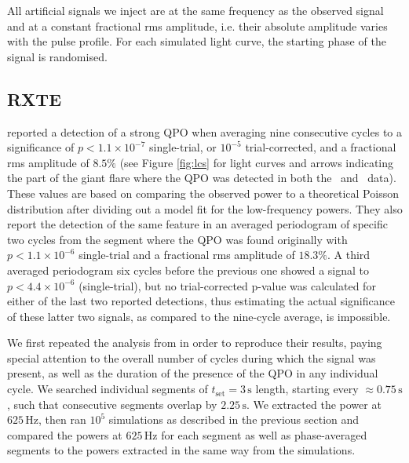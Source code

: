 \documentclass{emulateapj}
\begin{document}
All artificial signals we inject are at the same frequency as the observed signal and at a constant fractional rms amplitude, i.e. their absolute amplitude varies with the pulse profile. For each simulated light curve, the starting phase of the signal is randomised. 




\subsection{RXTE}
\label{sec:rxte_results}


\citealt{Strohmayer06} reported a detection of a strong QPO when averaging nine consecutive cycles to a significance of $p < 1.1 \times 10^{-7}$ single-trial, or $10^{-5}$ trial-corrected, and a fractional rms amplitude of $8.5\%$ (see Figure \ref{fig:lcs} for light curves and arrows indicating the part of the giant flare where the QPO was detected in both the \rxte\ and \rhessi\ data). These values are based on comparing the observed power to a theoretical Poisson distribution after dividing out a model fit for the low-frequency powers. They also report the detection of the same feature in an averaged periodogram of specific two cycles from the segment where the QPO was found originally with $p < 1.1 \times 10^{-6}$ single-trial and a fractional rms amplitude of $18.3\%$. A third averaged periodogram six cycles before the previous one showed a signal to $p < 4.4 \times 10^{-6}$ (single-trial), but no trial-corrected p-value was calculated for either of the last two reported detections, thus estimating the actual significance of these latter two signals, as compared to the nine-cycle average, is impossible.

We first repeated the analysis from \citealt{Strohmayer06} in order to reproduce their results, paying special attention to the overall number of cycles during which the signal was present, as well as the duration of the presence of the QPO in any individual cycle.
We searched individual segments of $t_{\mathrm{set}} = 3 \, \mathrm{s}$ length, starting every $\approx 0.75 \, \mathrm{s}$, such that consecutive segments overlap by $2.25 \, \mathrm{s}$. We extracted the power at $625 \, \mathrm{Hz}$, then ran $10^5$ simulations as described in the previous section and compared the powers at $625 \, \mathrm{Hz}$ for each segment as well as phase-averaged segments to the powers extracted in the same way from the simulations.
\end{document}
